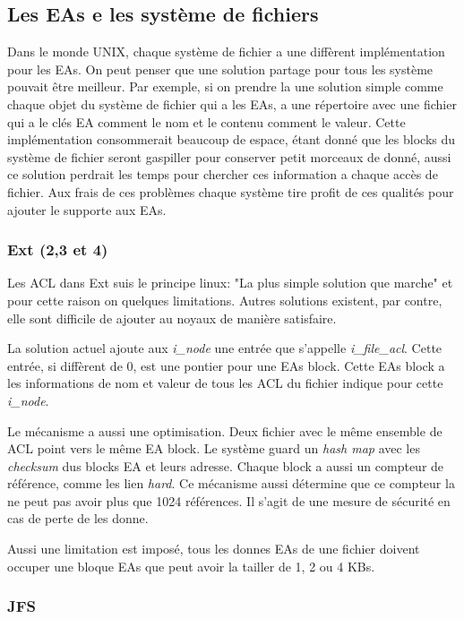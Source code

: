 \subsection{Les EAs e les système de fichiers}

Dans le monde UNIX, chaque système de fichier a une diffèrent implémentation pour les EAs. On peut penser que une solution partage pour tous les système pouvait être meilleur. Par exemple, si on prendre la une solution simple comme chaque objet du système de fichier qui a les EAs, a une répertoire avec une fichier qui a le clés EA comment le nom et le contenu comment le valeur. Cette implémentation consommerait beaucoup de espace, étant donné que les blocks du système de fichier seront gaspiller pour conserver petit morceaux de donné, aussi ce solution perdrait les temps pour chercher ces information a chaque accès de fichier. Aux frais de ces problèmes chaque système tire profit de ces qualités pour ajouter le supporte aux EAs. 

\subsubsection*{Ext (2,3 et 4)}

Les ACL dans Ext suis le principe linux: "La plus simple solution que marche" et pour cette raison on quelques limitations. Autres solutions existent, par contre, elle sont difficile de ajouter au noyaux de manière satisfaire\cite{ext_acl}. 

La solution actuel ajoute aux \emph{i\_node} une entrée que s'appelle \emph{i\_file\_acl}. Cette entrée, si diffèrent de 0, est une pontier pour une EAs block. Cette EAs block a les informations de nom et valeur de tous les ACL du fichier indique pour cette \emph{i\_node}.

Le mécanisme a aussi une optimisation. Deux fichier avec le même ensemble de ACL point vers le même EA block. Le système guard un \emph{hash map} avec les \emph{checksum} dus blocks EA et leurs adresse. Chaque block a aussi un compteur de référence, comme les lien \emph{hard}. Ce mécanisme aussi détermine que ce compteur la ne peut pas avoir plus que 1024 références. Il s'agit de une mesure de sécurité en cas de perte de les donne.  

Aussi une limitation est imposé, tous les donnes EAs de une fichier doivent occuper une bloque EAs que peut avoir la tailler de 1, 2 ou 4 KBs. 


\subsubsection*{JFS}


